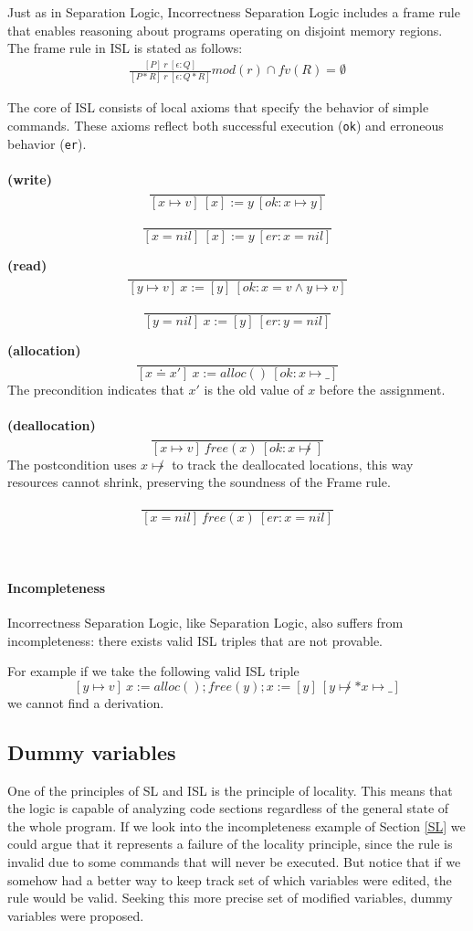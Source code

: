 \documentclass[parskip=half]{scrartcl}
\begin{document}
Just as in Separation Logic, Incorrectness Separation Logic includes a frame rule that enables reasoning about programs operating on disjoint memory regions. The frame rule in ISL is stated as follows:
\begin{align*}
    \frac{[P]\ r\ [\epsilon: Q]}{[P\ast R]\ r\ [\epsilon: Q\ast R]}mod(r)\cap fv(R)=\emptyset
\end{align*}

The core of ISL consists of local axioms that specify the behavior of simple commands. These axioms reflect both successful execution (\texttt{ok}) and erroneous behavior (\texttt{er}).
\\\\
\textbf{(write)} 
\[
\frac{}{[x\mapsto v]\ [x]:=y\ [ok:x\mapsto y]}
\]

\[
\frac{}{[x=nil]\ [x]:=y\ [er:x=nil]}
\]

\textbf{(read)} 
\[
\frac{}{[y\mapsto v]\ x:=[y]\ [ok:x=v\wedge y\mapsto v]}
\]

\[
\frac{}{[y=nil]\ x:=[y]\ [er:y=nil]}
\]

\textbf{(allocation)} 
\[
\frac{}{[x\doteq x']\ x:=alloc()\ [ok:x\mapsto \_]}
\]
The precondition indicates that $x'$ is the old value of $x$ before the assignment.
\\\\
\textbf{(deallocation)} 
\[
\frac{}{[x\mapsto v]\ free(x)\ [ok:x\not\mapsto]}
\]
The postcondition uses $x\not\mapsto$ to track the deallocated locations, this way resources cannot shrink, preserving the soundness of the Frame rule.

\[
\frac{}{[x=nil]\ free(x)\ [er:x=nil]}
\]
\\\\
\paragraph{Incompleteness}
Incorrectness Separation Logic, like Separation Logic, also suffers from incompleteness: there exists valid ISL triples that are not provable.

For example if we take the following valid ISL triple
\[
[y\mapsto v]\ x:=alloc();free(y);x:=[y]\ [y\not\mapsto\ast x\mapsto\_]
\]
we cannot find a derivation.

\subsection{Dummy variables}
One of the principles of SL and ISL is the principle of locality. This means that the logic is capable of analyzing code sections regardless of the general state of the whole program. If we look into the incompleteness example of Section \ref{SL} we could argue that it represents a failure of the locality principle, since the rule is invalid due to some commands that will never be executed. But notice that if we somehow had a better way to keep track set of which variables were edited, the rule would be valid. Seeking this more precise set of modified variables, dummy variables were proposed.
\end{document}

